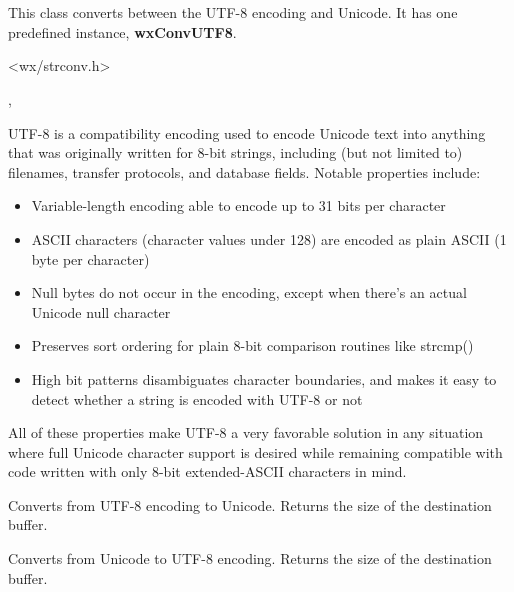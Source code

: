 %
%

\section{}\label{wxmbconvutf8}

This class converts between the UTF-8 encoding and Unicode.
It has one predefined instance, {\bf wxConvUTF8}.




<wx/strconv.h>




, 


UTF-8 is a compatibility encoding used to encode Unicode text into anything that was
originally written for 8-bit strings, including (but not limited to) filenames, transfer
protocols, and database fields. Notable properties include:

\begin{itemize}
\item Variable-length encoding able to encode up to 31 bits per character
\item ASCII characters (character values under 128) are encoded as plain ASCII
(1 byte per character)
\item Null bytes do not occur in the encoding, except when there's an actual Unicode
null character
\item Preserves sort ordering for plain 8-bit comparison routines like strcmp()
\item High bit patterns disambiguates character boundaries, and makes it easy to
detect whether a string is encoded with UTF-8 or not
\end{itemize}

All of these properties make UTF-8 a very favorable solution in any situation
where full Unicode character support is desired while remaining compatible with
code written with only 8-bit extended-ASCII characters in mind.



\label{wxmbconvutf8mb2wc}


Converts from UTF-8 encoding to Unicode. Returns the size of the destination buffer.

\label{wxmbconvutf8wc2mb}


Converts from Unicode to UTF-8 encoding. Returns the size of the destination buffer.


